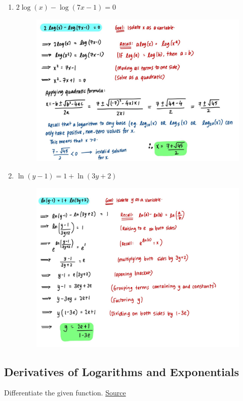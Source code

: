 \documentclass{article}
\begin{document}
\begin{enumerate}
\begin{figure}[H]
        \label{fig:Q2}
    \end{figure}
    \item $2\log(x)-\log(7x-1) = 0$
    \begin{figure}[H]
        \centering
        \includegraphics[width=0.8\linewidth]{Q3.jpg}
        \label{fig:Q3}
    \end{figure}
    \item $\ln(y-1)=1+\ln(3y+2)$
    \begin{figure}[H]
        \centering
        \includegraphics[width=0.9\linewidth]{Q4.jpg}
        \label{fig:Q4}
    \end{figure}
\end{enumerate}

\newpage
\subsection*{Derivatives of Logarithms and Exponentials}
Differentiate the given function.
\noindent \newline \href{https://tutorial.math.lamar.edu/problems/calci/diffexplogfcns.aspx}{Source}
\end{document}
